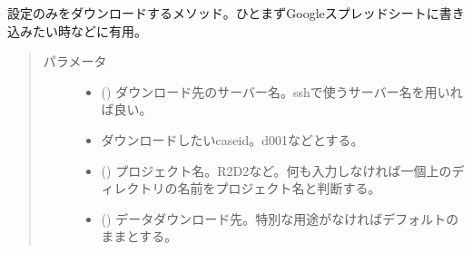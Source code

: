 \documentclass[letterpaper,10pt,dvipdfmx,report]{sphinxmanual}
\begin{document}
\begin{fulllineitems}
\label{\detokenize{io:R2D2.R2D2.sync.set}}
設定のみをダウンロードするメソッド。ひとまずGoogleスプレッドシートに書き込みたい時などに有用。
\begin{quote}\begin{description}
\item[{パラメータ}] \leavevmode\begin{itemize}
\item {} 
 () \sphinxhyphen{}\sphinxhyphen{} ダウンロード先のサーバー名。sshで使うサーバー名を用いれば良い。

\item {} 
 \sphinxhyphen{}\sphinxhyphen{} ダウンロードしたいcaseid。\textquotesingle{}d001\textquotesingle{}などとする。

\item {} 
 () \sphinxhyphen{}\sphinxhyphen{} プロジェクト名。\textquotesingle{}R2D2\textquotesingle{}など。何も入力しなければ一個上のディレクトリの名前をプロジェクト名と判断する。

\item {} 
 () \sphinxhyphen{}\sphinxhyphen{} データダウンロード先。特別な用途がなければデフォルトのままとする。

\end{itemize}

\end{description}\end{quote}

\end{fulllineitems}

\end{document}
